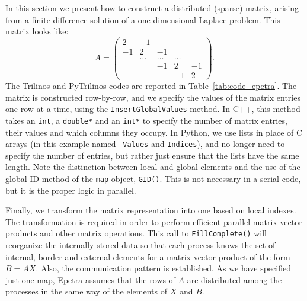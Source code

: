 \documentclass[acmtocl]{acmtrans2m}
\begin{document}
In this section we present how to construct a distributed (sparse)
matrix, arising from a finite-difference solution of a
one-dimensional Laplace problem. This matrix looks like:
\begin{equation*}
  A = \begin{pmatrix}
     2 & -1     &        &        &    \\
    -1 &  2     & -1     &        &    \\
       & \ldots & \ldots & \ldots &    \\
       &        & -1     & 2      & -1 \\
       &        &        & -1     & 2
  \end{pmatrix}.
\end{equation*}
The Trilinos and PyTrilinos codes are reported in
Table~\ref{tab:code_epetra}.  The matrix is constructed row-by-row,
and we specify the values of the matrix entries one row at a time,
using the {\tt InsertGlobalValues} method.  In C++, this method takes
an {\tt int}, a {\tt double*} and an {\tt int*} to specify the number
of matrix entries, their values and which columns they occupy.  In
Python, we use lists in place of C arrays (in this example named {\tt
  Values} and {\tt Indices}), and no longer need to specify the number
of entries, but rather just ensure that the lists have the same
length.  Note the distinction between local and global elements and
the use of the global ID method of the {\tt map} object, {\tt GID()}.
This is not necessary in a serial code, but it is the proper logic in
parallel.

Finally, we transform the matrix representation into one based on
local indexes. The transformation is required in order to perform
efficient parallel matrix-vector products and other matrix
operations. This call to {\tt FillComplete()} will reorganize the
internally stored data so that each process knows the set of internal,
border and external elements for a matrix-vector product of the form
$B = AX$. Also, the communication pattern is established. As we have
specified just one map, Epetra assumes that the rows of $A$ are
distributed among the processes in the same way of the elements of $X$
and $B$.
\end{document}
